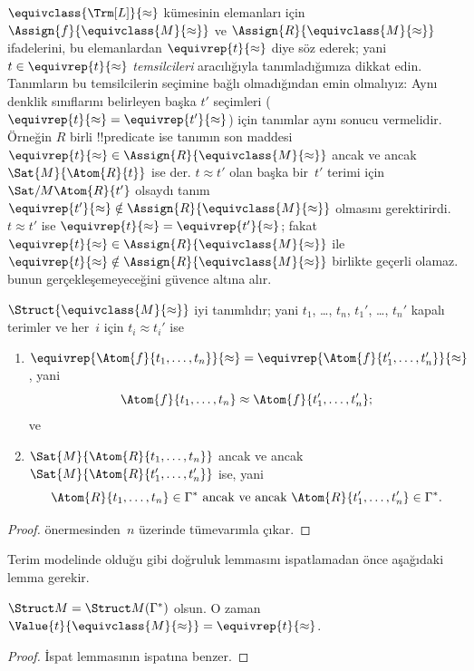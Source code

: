 \begin{explain}
$\equivclass{\Trm[L]}{\approx}$ kümesinin elemanları için
$\Assign{f}{\equivclass{M}{\approx}}$ ve
$\Assign{R}{\equivclass{M}{\approx}}$ ifadelerini, bu elemanlardan
$\equivrep{t}{\approx}$ diye söz ederek; yani
$t\in\equivrep{t}{\approx}$ \emph{temsilcileri} aracılığıyla
tanımladığımıza dikkat edin. Tanımların bu temsilcilerin seçimine bağlı
olmadığından emin olmalıyız: Aynı denklik sınıflarını belirleyen başka
$t'$ seçimleri ($\equivrep{t}{\approx}=\equivrep{t'}{\approx}$) için
tanımlar aynı sonucu vermelidir. Örneğin $R$ birli !!{predicate} ise
tanımın son maddesi $\equivrep{t}{\approx}\in
\Assign{R}{\equivclass{M}{\approx}}$ ancak ve ancak
$\Sat{M}{\Atom{R}{t}}$ ise der. $t\approx t'$ olan başka bir~$t'$
terimi için $\Sat/{M}{\Atom{R}{t'}}$ olsaydı tanım
$\equivrep{t'}{\approx}\notin\Assign{R}{\equivclass{M}{\approx}}$
olmasını gerektirirdi. $t\approx t'$ ise
$\equivrep{t}{\approx}=\equivrep{t'}{\approx}$; fakat
$\equivrep{t}{\approx}\in\Assign{R}{\equivclass{M}{\approx}}$ ile
$\equivrep{t}{\approx}\notin\Assign{R}{\equivclass{M}{\approx}}$ birlikte
geçerli olamaz.  bunun
gerçekleşemeyeceğini güvence altına alır.
\end{explain}

\begin{prop}
$\Struct{\equivclass{M}{\approx}}$ iyi tanımlıdır; yani $t_1$, \dots,
$t_n$, $t_1'$, \dots, $t_n'$ kapalı terimler ve her~$i$ için
$t_i\approx t_i'$ ise
\begin{enumerate}
\item $\equivrep{\Atom{f}{t_1,\dots,t_n}}{\approx}=
    \equivrep{\Atom{f}{t_1',\dots,t_n'}}{\approx}$, yani
  \[
  \Atom{f}{t_1,\dots,t_n}\approx\Atom{f}{t_1',\dots,t_n'};
  \]
  ve
\item $\Sat{M}{\Atom{R}{t_1,\dots,t_n}}$ ancak ve ancak
  $\Sat{M}{\Atom{R}{t_1',\dots,t_n'}}$ ise, yani
  \[
    \Atom{R}{t_1,\dots,t_n}\in\Gamma^* \text{ ancak ve ancak }
    \Atom{R}{t_1',\dots,t_n'}\in\Gamma^*.
  \]
\end{enumerate}
\end{prop}

\begin{proof}
 önermesinden~$n$ üzerinde tümevarımla çıkar.
\end{proof}

Terim modelinde olduğu gibi doğruluk lemmasını ispatlamadan önce
aşağıdaki lemma gerekir.

\begin{lem}
 $\Struct M=\Struct M(\Gamma^*)$
olsun. O zaman
$\Value{t}{\equivclass{M}{\approx}}=\equivrep{t}{\approx}$.
\end{lem}
\begin{proof}
İspat  lemmasının ispatına benzer.
\end{proof}

